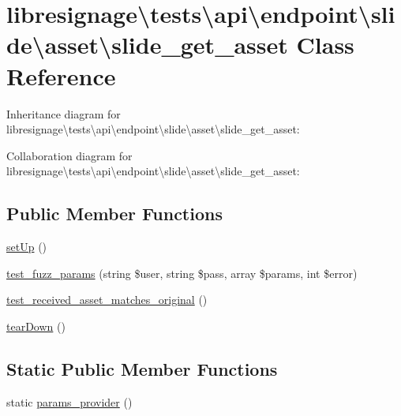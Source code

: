 \hypertarget{classlibresignage_1_1tests_1_1api_1_1endpoint_1_1slide_1_1asset_1_1slide__get__asset}{}\section{libresignage\textbackslash{}tests\textbackslash{}api\textbackslash{}endpoint\textbackslash{}slide\textbackslash{}asset\textbackslash{}slide\+\_\+get\+\_\+asset Class Reference}
\label{classlibresignage_1_1tests_1_1api_1_1endpoint_1_1slide_1_1asset_1_1slide__get__asset}


Inheritance diagram for libresignage\textbackslash{}tests\textbackslash{}api\textbackslash{}endpoint\textbackslash{}slide\textbackslash{}asset\textbackslash{}slide\+\_\+get\+\_\+asset\+:


Collaboration diagram for libresignage\textbackslash{}tests\textbackslash{}api\textbackslash{}endpoint\textbackslash{}slide\textbackslash{}asset\textbackslash{}slide\+\_\+get\+\_\+asset\+:
\subsection*{Public Member Functions}
\begin{DoxyCompactItemize}
\item 
\hyperlink{classlibresignage_1_1tests_1_1api_1_1endpoint_1_1slide_1_1asset_1_1slide__get__asset_ab7070ebeac9bb5789233e9a4b63b9bcb}{set\+Up} ()
\item 
\hyperlink{classlibresignage_1_1tests_1_1api_1_1endpoint_1_1slide_1_1asset_1_1slide__get__asset_ac6bb4ddf107bf0eec6259c85117e4c6b}{test\+\_\+fuzz\+\_\+params} (string \$user, string \$pass, array \$params, int \$error)
\item 
\hyperlink{classlibresignage_1_1tests_1_1api_1_1endpoint_1_1slide_1_1asset_1_1slide__get__asset_a63b8f94b3c100f21b4847861663ab652}{test\+\_\+received\+\_\+asset\+\_\+matches\+\_\+original} ()
\item 
\hyperlink{classlibresignage_1_1tests_1_1api_1_1endpoint_1_1slide_1_1asset_1_1slide__get__asset_a0e74b24ac8ac30028b0f57aaf4dbc7fe}{tear\+Down} ()
\end{DoxyCompactItemize}
\subsection*{Static Public Member Functions}
\begin{DoxyCompactItemize}
\item 
static \hyperlink{classlibresignage_1_1tests_1_1api_1_1endpoint_1_1slide_1_1asset_1_1slide__get__asset_af4e6c646b97458da24e69c9574a5ba23}{params\+\_\+provider} ()
\end{DoxyCompactItemize}
